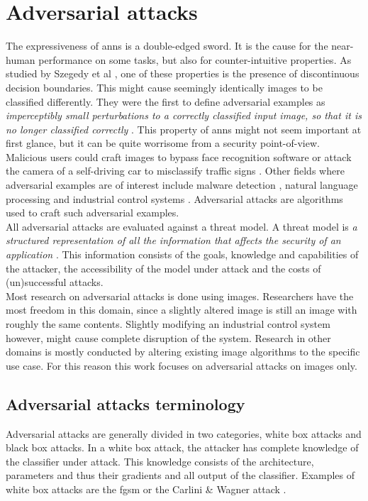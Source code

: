 \section{Adversarial attacks}
The expressiveness of \glspl{ann} is a double-edged sword. It is the cause for the near-human performance on some tasks, but also for counter-intuitive properties. As studied by Szegedy et al \cite{szegedy2014intriguing}, one of these properties is the presence of discontinuous decision boundaries. This might cause seemingly identically images to be classified differently. They were the first to define adversarial examples as \textit{imperceptibly small perturbations to a correctly classified input image, so that it is no longer classified correctly} \cite{szegedy2014intriguing}. This property of \glspl{ann} might not seem important at first glance, but it can be quite worrisome from a security point-of-view. Malicious users could craft images to bypass face recognition software \cite{face_recognition} or attack the camera of a self-driving car to misclassify traffic signs \cite{traffic_signs}. Other fields where adversarial examples are of interest include malware detection \cite{malware_detection}, natural language processing \cite{adversarial_nlp} and industrial control systems \cite{adversarial_industrial_control_system}. Adversarial attacks are algorithms used to craft such adversarial examples.\\ 

All adversarial attacks are evaluated against a threat model. A threat model is \textit{a structured representation of all the information that affects the security of an application} \cite{threat_model}. This information consists of the goals, knowledge and capabilities of the attacker, the accessibility of the model under attack and the costs of (un)successful attacks.\\

Most research on adversarial attacks is done using images. Researchers have the most freedom in this domain, since a slightly altered image is still an image with roughly the same contents. Slightly modifying an industrial control system however, might cause complete disruption of the system. Research in other domains is mostly conducted by altering existing image algorithms to the specific use case. For this reason this work focuses on adversarial attacks on images only.\\ 


\subsection{Adversarial attacks terminology}
Adversarial attacks are generally divided in two categories, white box attacks and black box attacks. In a white box attack, the attacker has complete knowledge of the classifier under attack. This knowledge consists of the architecture, parameters and thus their gradients and all output of the classifier. Examples of white box attacks are the \gls{fgsm} \cite{FGSM} or the Carlini \& Wagner attack \cite{cw_attack}.\\

